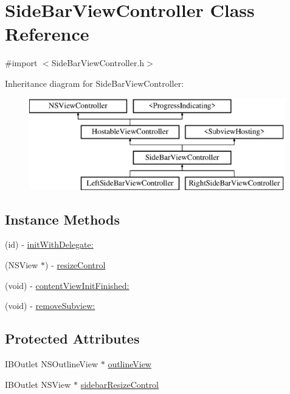 \hypertarget{interface_side_bar_view_controller}{\section{Side\-Bar\-View\-Controller Class Reference}
\label{interface_side_bar_view_controller}
}


{\ttfamily \#import $<$Side\-Bar\-View\-Controller.\-h$>$}

Inheritance diagram for Side\-Bar\-View\-Controller\-:\begin{figure}[H]
\begin{center}
\leavevmode
\includegraphics[height=4.000000cm]{interface_side_bar_view_controller}
\end{center}
\end{figure}
\subsection*{Instance Methods}
\begin{DoxyCompactItemize}
\item 
(id) -\/ \hyperlink{interface_side_bar_view_controller_a31987d71b58e0520588676a4f6896d2c}{init\-With\-Delegate\-:}
\item 
(N\-S\-View $\ast$) -\/ \hyperlink{interface_side_bar_view_controller_a52f43ff88aa47f4a6b383e5133932ea4}{resize\-Control}
\item 
(void) -\/ \hyperlink{interface_side_bar_view_controller_a0bd73ec236f8055ac6566b39ddf66add}{content\-View\-Init\-Finished\-:}
\item 
(void) -\/ \hyperlink{interface_side_bar_view_controller_afc97bbb7e9b0d2f6b9fd995ada16f4a1}{remove\-Subview\-:}
\end{DoxyCompactItemize}
\subsection*{Protected Attributes}
\begin{DoxyCompactItemize}
\item 
I\-B\-Outlet N\-S\-Outline\-View $\ast$ \hyperlink{interface_side_bar_view_controller_a2df5f78f79ebb8f68653c3b54304e6e8}{outline\-View}
\item 
I\-B\-Outlet N\-S\-View $\ast$ \hyperlink{interface_side_bar_view_controller_ac444dd01ffca31423ba3dff609928afb}{sidebar\-Resize\-Control}
\end{DoxyCompactItemize}
